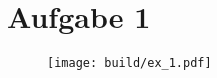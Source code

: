 \section*{Aufgabe 1}
\begin{figure}
    \centering
    \texttt{[image: build/ex\_1.pdf]}
\end{figure}